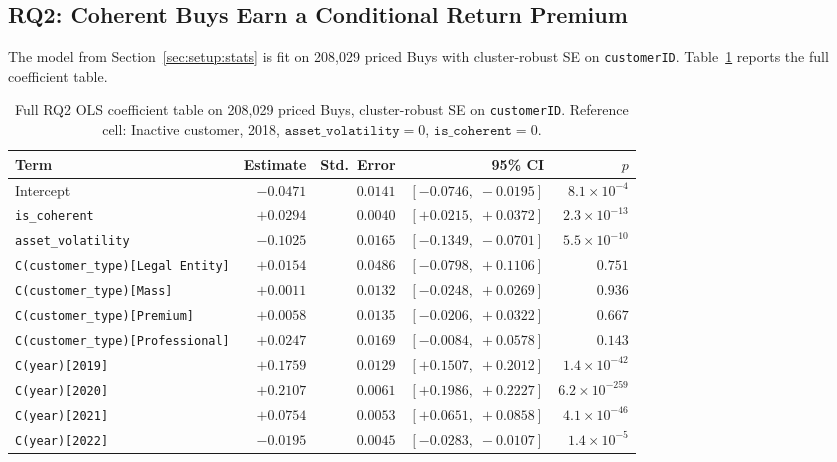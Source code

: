 \subsection{RQ2: Coherent Buys Earn a Conditional Return Premium}
\label{sec:results:rq2}

The model from Section~\ref{sec:setup:stats} is fit on 208{,}029 priced Buys with cluster-robust SE on \texttt{customerID}. Table~\ref{tab:rq2-full} reports the full coefficient table.

\begin{table}[!t]
\centering
\small
\begin{tabular}{lrrrr}
\toprule
Term & Estimate & Std.\ Error & 95\% CI & $p$ \\
\midrule
Intercept                                & $-0.0471$ & $0.0141$ & $[-0.0746,\; -0.0195]$ & $8.1 \times 10^{-4}$ \\
\texttt{is\_coherent}                    & $+0.0294$ & $0.0040$ & $[+0.0215,\; +0.0372]$ & $2.3 \times 10^{-13}$ \\
\texttt{asset\_volatility}               & $-0.1025$ & $0.0165$ & $[-0.1349,\; -0.0701]$ & $5.5 \times 10^{-10}$ \\
\texttt{C(customer\_type)[Legal Entity]} & $+0.0154$ & $0.0486$ & $[-0.0798,\; +0.1106]$ & $0.751$ \\
\texttt{C(customer\_type)[Mass]}         & $+0.0011$ & $0.0132$ & $[-0.0248,\; +0.0269]$ & $0.936$ \\
\texttt{C(customer\_type)[Premium]}      & $+0.0058$ & $0.0135$ & $[-0.0206,\; +0.0322]$ & $0.667$ \\
\texttt{C(customer\_type)[Professional]} & $+0.0247$ & $0.0169$ & $[-0.0084,\; +0.0578]$ & $0.143$ \\
\texttt{C(year)[2019]}                   & $+0.1759$ & $0.0129$ & $[+0.1507,\; +0.2012]$ & $1.4 \times 10^{-42}$ \\
\texttt{C(year)[2020]}                   & $+0.2107$ & $0.0061$ & $[+0.1986,\; +0.2227]$ & $6.2 \times 10^{-259}$ \\
\texttt{C(year)[2021]}                   & $+0.0754$ & $0.0053$ & $[+0.0651,\; +0.0858]$ & $4.1 \times 10^{-46}$ \\
\texttt{C(year)[2022]}                   & $-0.0195$ & $0.0045$ & $[-0.0283,\; -0.0107]$ & $1.4 \times 10^{-5}$ \\
\bottomrule
\end{tabular}
\caption{Full RQ2 OLS coefficient table on 208{,}029 priced Buys, cluster-robust SE on \texttt{customerID}. Reference cell: Inactive customer, 2018, $\texttt{asset\_volatility} = 0$, $\texttt{is\_coherent} = 0$.}
\label{tab:rq2-full}
\end{table}

